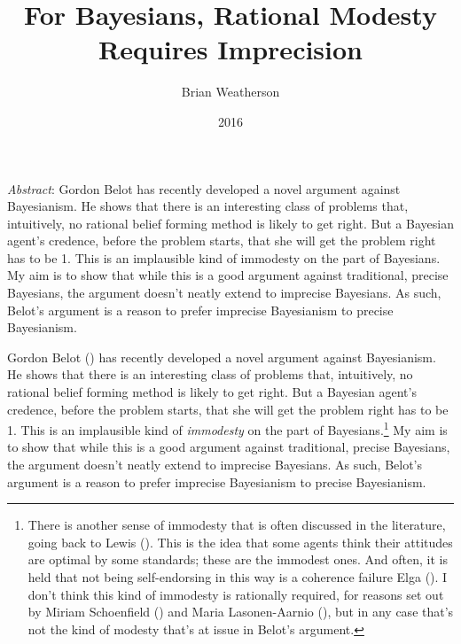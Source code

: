 \documentclass[
  11pt,
  letterpaper,
  DIV=11,
  numbers=noendperiod,
  twoside]{scrartcl}
\title{For Bayesians, Rational Modesty Requires Imprecision}
\author{Brian Weatherson}
\date{2016}
\renewenvironment{abstract}
 {\vspace{-1.25cm}
 \quotation\small\noindent\emph{Abstract}:}
 {\endquotation}
\renewenvironment{abstract}
 {\quotation\small\noindent\emph{Abstract}:}
 {\endquotation\vspace{-0.02cm}}
\begin{document}
\maketitle
\begin{abstract}
Gordon Belot has recently developed a novel argument against
Bayesianism. He shows that there is an interesting class of problems
that, intuitively, no rational belief forming method is likely to get
right. But a Bayesian agent's credence, before the problem starts, that
she will get the problem right has to be 1. This is an implausible kind
of immodesty on the part of Bayesians. My aim is to show that while this
is a good argument against traditional, precise Bayesians, the argument
doesn't neatly extend to imprecise Bayesians. As such, Belot's argument
is a reason to prefer imprecise Bayesianism to precise Bayesianism.
\end{abstract}


Gordon Belot () has recently developed a
novel argument against Bayesianism. He shows that there is an
interesting class of problems that, intuitively, no rational belief
forming method is likely to get right. But a Bayesian agent's credence,
before the problem starts, that she will get the problem right has to be
1. This is an implausible kind of \emph{immodesty} on the part of
Bayesians.\footnote{There is another sense of immodesty that is often
  discussed in the literature, going back to Lewis
  (). This is the idea that some agents
  think their attitudes are optimal by some standards; these are the
  immodest ones. And often, it is held that not being self-endorsing in
  this way is a coherence failure Elga
  (). I don't think this kind of
  immodesty is rationally required, for reasons set out by Miriam
  Schoenfield () and Maria
  Lasonen-Aarnio (), but in any
  case that's not the kind of modesty that's at issue in Belot's
  argument.} My aim is to show that while this is a good argument
against traditional, precise Bayesians, the argument doesn't neatly
extend to imprecise Bayesians. As such, Belot's argument is a reason to
prefer imprecise Bayesianism to precise Bayesianism.
\end{document}
